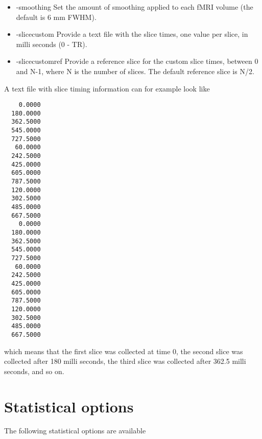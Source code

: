 \begin{itemize}
\item -smoothing 
\newline \newline Set the amount of smoothing applied to \newline each fMRI volume (the default is 6 mm FWHM). 

\newpage

\item -slicecustom
\newline \newline Provide a text file with the slice times, \newline
				  one value per slice, in milli seconds (0 - TR). \newline

\item -slicecustomref
\newline \newline Provide a reference slice for the custom slice times, \newline
				  between 0 and N-1, where N is the number of slices. \newline
				  The default reference slice is N/2.
 
\end{itemize}

A text file with slice timing information can for example look like
\begin{verbatim}
    0.0000
  180.0000
  362.5000
  545.0000
  727.5000
   60.0000
  242.5000
  425.0000
  605.0000
  787.5000
  120.0000
  302.5000
  485.0000
  667.5000
    0.0000
  180.0000
  362.5000
  545.0000
  727.5000
   60.0000
  242.5000
  425.0000
  605.0000
  787.5000
  120.0000
  302.5000
  485.0000
  667.5000
\end{verbatim}
which means that the first slice was collected at time 0, the second slice was collected after 180 milli seconds, the third slice was collected after 362.5 milli seconds, and so on.

\newpage


\section{Statistical options}

The following statistical options are available

